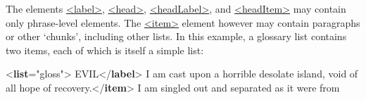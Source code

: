 The elements \hyperref[TEI.label]{<label>}, \hyperref[TEI.head]{<head>}, \hyperref[TEI.headLabel]{<headLabel>}, and \hyperref[TEI.headItem]{<headItem>} may contain only phrase-level elements. The \hyperref[TEI.item]{<item>} element however may contain paragraphs or other ‘chunks’, including other lists. In this example, a glossary list contains two items, each of which is itself a simple list: \par\bgroup{}\exampleFont \begin{shaded}\noindent\mbox{}{<\textbf{list}\hspace*{1em}{type}="{gloss}">}\mbox{}\newline 
{}EVIL{</\textbf{label}>}\mbox{}\newline 
{}\mbox{}\newline 
\hspace*{1em}\mbox{}\newline 
\hspace*{1em}\hspace*{1em}I am cast upon a horrible desolate island, void\mbox{}\newline 
\hspace*{1em}\hspace*{1em}\hspace*{1em}\hspace*{1em}\hspace*{1em}\hspace*{1em} of all hope of recovery.{</\textbf{item}>}\mbox{}\newline 
\hspace*{1em}\hspace*{1em}I am singled out and separated as it were from\mbox{}\newline 

\end{shaded}
